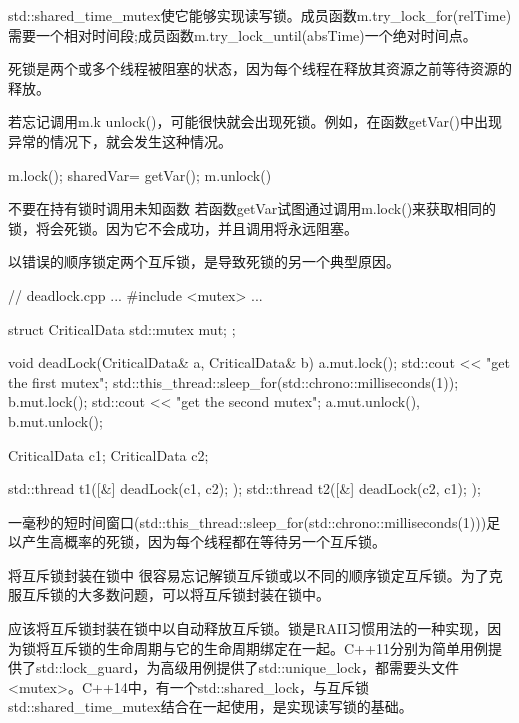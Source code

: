 std::shared\_time\_mutex使它能够实现读写锁。成员函数m.try\_lock\_for(relTime)需要一个相对时间段;成员函数m.try\_lock\_until(absTime)一个绝对时间点。



死锁是两个或多个线程被阻塞的状态，因为每个线程在释放其资源之前等待资源的释放。

若忘记调用m.k unlock()，可能很快就会出现死锁。例如，在函数getVar()中出现异常的情况下，就会发生这种情况。

\begin{cpp}
m.lock();
sharedVar= getVar();
m.unlock()
\end{cpp}

\begin{myWarning}{不要在持有锁时调用未知函数}
若函数getVar试图通过调用m.lock()来获取相同的锁，将会死锁。因为它不会成功，并且调用将永远阻塞。
\end{myWarning}

以错误的顺序锁定两个互斥锁，是导致死锁的另一个典型原因。


\begin{cpp}
// deadlock.cpp
...
#include <mutex>
...

struct CriticalData{
	std::mutex mut;
};

void deadLock(CriticalData& a, CriticalData& b){
	a.mut.lock();
	std::cout << "get the first mutex\n";
	std::this_thread::sleep_for(std::chrono::milliseconds(1));
	b.mut.lock();
	std::cout << "get the second mutex\n";
	a.mut.unlock(), b.mut.unlock();
}

CriticalData c1;
CriticalData c2;

std::thread t1([&]{ deadLock(c1, c2); });
std::thread t2([&]{ deadLock(c2, c1); });
\end{cpp}

一毫秒的短时间窗口(std::this\_thread::sleep\_for(std::chrono::milliseconds(1)))足以产生高概率的死锁，因为每个线程都在等待另一个互斥锁。


\begin{myTip}{将互斥锁封装在锁中}
很容易忘记解锁互斥锁或以不同的顺序锁定互斥锁。为了克服互斥锁的大多数问题，可以将互斥锁封装在锁中。
\end{myTip}


应该将互斥锁封装在锁中以自动释放互斥锁。锁是RAII习惯用法的一种实现，因为锁将互斥锁的生命周期与它的生命周期绑定在一起。C++11分别为简单用例提供了std::lock\_guard，为高级用例提供了std::unique\_lock，都需要头文件<mutex>。C++14中，有一个std::shared\_lock，与互斥锁std::shared\_time\_mutex结合在一起使用，是实现读写锁的基础。

